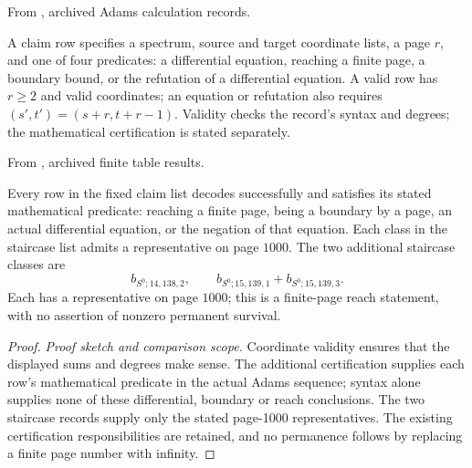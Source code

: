 \begin{theorem}
\label{sem:Computation:table-certification}
From \cite{LinProgram}, archived Adams calculation records.\par
A claim row specifies a spectrum, source and target coordinate lists, a page $r$, and one of four predicates: a differential equation, reaching a finite page, a boundary bound, or the refutation of a differential equation. A valid row has $r\geq2$ and valid coordinates; an equation or refutation also requires $(s\prime,t\prime)=(s+r,t+r-1)$. Validity checks the record's syntax and degrees; the mathematical certification is stated separately.

From \cite{LinProgram}, archived finite table results.\par
Every row in the fixed claim list decodes successfully and satisfies its stated mathematical predicate: reaching a finite page, being a boundary by a page, an actual differential equation, or the negation of that equation. Each class in the staircase list admits a representative on page $1000$.
The two additional staircase classes are
\[
b_{S^0;14,138,2},\qquad b_{S^0;15,139,1}+b_{S^0;15,139,3}.
\]
Each has a representative on page $1000$; this is a finite-page reach
statement, with no assertion of nonzero permanent survival.
\end{theorem}
\begin{proof}
\textit{Proof sketch and comparison scope.}
Coordinate validity ensures that the displayed sums and degrees make
sense. The additional certification supplies each row's mathematical
predicate in the actual Adams sequence; syntax alone supplies none of
these differential, boundary or reach conclusions. The two staircase
records supply only the stated page-1000 representatives. The existing
certification responsibilities are retained, and no permanence follows
by replacing a finite page number with infinity.
\end{proof}


